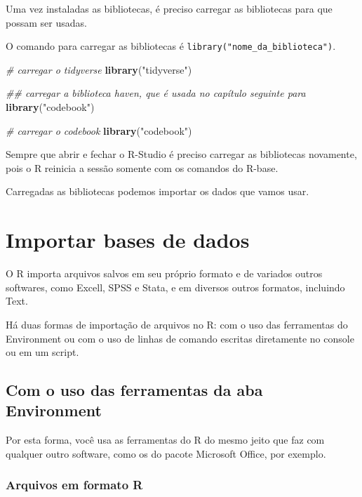 \documentclass[
  brazil,
]{book}
\newenvironment{Shaded}{\begin{snugshade}}{\end{snugshade}}
\newcommand{\CommentTok}[1]{\textcolor[rgb]{0.56,0.35,0.01}{\textit{#1}}}
\newcommand{\KeywordTok}[1]{\textcolor[rgb]{0.13,0.29,0.53}{\textbf{#1}}}
\newcommand{\NormalTok}[1]{#1}
\newcommand{\StringTok}[1]{\textcolor[rgb]{0.31,0.60,0.02}{#1}}
\begin{document}
Uma vez instaladas as bibliotecas, é preciso carregar as bibliotecas para que possam ser usadas.

O comando para carregar as bibliotecas é \texttt{library("nome\_da\_biblioteca")}.

\begin{Shaded}
\begin{Highlighting}[]
\CommentTok{# carregar o tidyverse}
\KeywordTok{library}\NormalTok{(}\StringTok{"tidyverse"}\NormalTok{)}

\CommentTok{## carregar a biblioteca haven, que é usada no capítulo seguinte para }
\KeywordTok{library}\NormalTok{(}\StringTok{"codebook"}\NormalTok{)}

\CommentTok{# carregar o codebook}
\KeywordTok{library}\NormalTok{(}\StringTok{"codebook"}\NormalTok{)}
\end{Highlighting}
\end{Shaded}

Sempre que abrir e fechar o R-Studio é preciso carregar as bibliotecas novamente, pois o R reinicia a sessão somente com os comandos do R-base.

Carregadas as bibliotecas podemos importar os dados que vamos usar.

\hypertarget{importar-bases-de-dados}{%
\chapter{Importar bases de dados}\label{importar-bases-de-dados}}

O R importa arquivos salvos em seu próprio formato e de variados outros softwares, como Excell, SPSS e Stata, e em diversos outros formatos, incluindo Text.

Há duas formas de importação de arquivos no R: com o uso das ferramentas do Environment ou com o uso de linhas de comando escritas diretamente no console ou em um script.

\hypertarget{com-o-uso-das-ferramentas-da-aba-environment}{%
\section{Com o uso das ferramentas da aba Environment}\label{com-o-uso-das-ferramentas-da-aba-environment}}

Por esta forma, você usa as ferramentas do R do mesmo jeito que faz com qualquer outro software, como os do pacote Microsoft Office, por exemplo.

\hypertarget{arquivos-em-formato-r}{%
\subsection{Arquivos em formato R}\label{arquivos-em-formato-r}}
\end{document}
